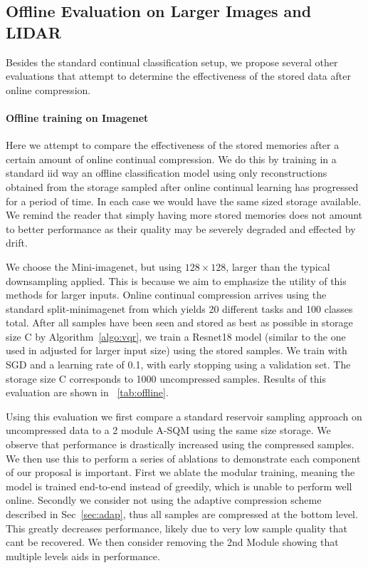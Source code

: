 \documentclass[colorinlistoftodos]{article} %
\begin{document}
\subsection{Offline Evaluation on Larger Images and LIDAR}
\label{sec:off}
Besides the standard continual classification setup, we propose several other evaluations that attempt to determine the effectiveness of the stored data after online compression.

\paragraph{Offline training on Imagenet} Here we attempt to compare the effectiveness of the stored memories after a certain amount of online continual compression. We do this by training in a standard iid way an offline classification model using only reconstructions obtained from the storage sampled after online continual learning has progressed for a period of time.  In each case we would have the same sized storage available. We remind the reader that simply having more stored memories does not amount to better performance as their quality may be severely degraded and effected by drift. 

We choose the Mini-imagenet, but using $128 \times 128$, larger than the typical downsampling applied. This is because we aim to emphasize the utility of this methods for larger inputs. Online continual compression arrives using the standard split-minimagenet from \cite{chaudhry2019continual} which yields 20 different tasks and 100 classes total. After all samples have been seen and stored as best as possible in storage size C by Algorithm~\ref{algo:vqr}, we train a Resnet18 model (similar to the one used in \cite{chaudhry2019continual} adjusted for larger input size) using the stored samples. We train with SGD and a learning rate of 0.1, with early stopping using a validation set. The storage size C corresponds to 1000 uncompressed samples. Results of this evaluation are shown in ~\ref{tab:offline}. 

Using this evaluation we first compare a standard reservoir sampling approach on uncompressed data to a 2 module A-SQM using the same size storage. We observe that performance is drastically increased using the compressed samples. We then use this to perform a series of ablations to demonstrate each component of our proposal is important. First we ablate the modular training, meaning the model is trained end-to-end instead of greedily, which is unable to perform well online. Secondly we consider not using the adaptive compression scheme described in Sec~\ref{sec:adap}, thus all samples are compressed at the bottom level. This greatly decreases performance, likely due to very low sample quality that cant be recovered. We then consider removing the 2nd Module showing that multiple levels aids in performance.
\end{document}
